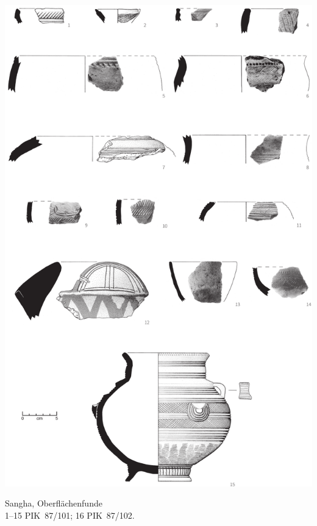 \begin{pl}[H]
	\includegraphics{plt/Taf56.pdf}
	\vspace{.75em}\caption{\mbox{Sangha}, Oberflächenfunde \\ 1--15 PIK~87/101; 16 PIK~87/102.}
	\label{pl:56}
\end{pl}


